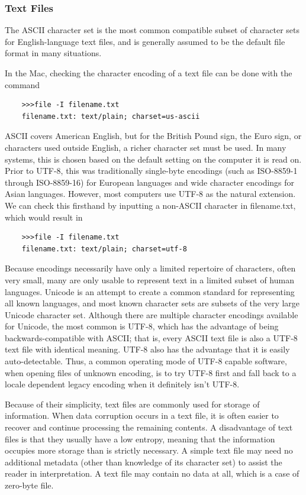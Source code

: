   \subsubsection{Text Files}

    The ASCII character set is the most common compatible subset of character sets for English-language text files, and is generally assumed to be the default file format in many situations. 

    In the Mac, checking the character encoding of a text file can be done with the command 
    \begin{lstlisting}
    >>>file -I filename.txt
    filename.txt: text/plain; charset=us-ascii
    \end{lstlisting}
    ASCII covers American English, but for the British Pound sign, the Euro sign, or characters used outside English, a richer character set must be used. In many systems, this is chosen based on the default setting on the computer it is read on. Prior to UTF-8, this was traditionally single-byte encodings (such as ISO-8859-1 through ISO-8859-16) for European languages and wide character encodings for Asian languages. However, most computers use UTF-8 as the natural extension. We can check this firsthand by inputting a non-ASCII character in filename.txt, which would result in
    \begin{lstlisting}
    >>>file -I filename.txt
    filename.txt: text/plain; charset=utf-8
    \end{lstlisting}
    Because encodings necessarily have only a limited repertoire of characters, often very small, many are only usable to represent text in a limited subset of human languages. Unicode is an attempt to create a common standard for representing all known languages, and most known character sets are subsets of the very large Unicode character set. Although there are multiple character encodings available for Unicode, the most common is UTF-8, which has the advantage of being backwards-compatible with ASCII; that is, every ASCII text file is also a UTF-8 text file with identical meaning. UTF-8 also has the advantage that it is easily auto-detectable. Thus, a common operating mode of UTF-8 capable software, when opening files of unknown encoding, is to try UTF-8 first and fall back to a locale dependent legacy encoding when it definitely isn't UTF-8.

    Because of their simplicity, text files are commonly used for storage of information. When data corruption occurs in a text file, it is often easier to recover and continue processing the remaining contents. A disadvantage of text files is that they usually have a low entropy, meaning that the information occupies more storage than is strictly necessary. A simple text file may need no additional metadata (other than knowledge of its character set) to assist the reader in interpretation. A text file may contain no data at all, which is a case of zero-byte file.

